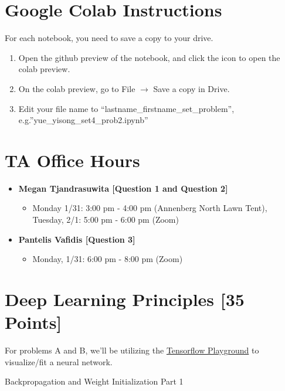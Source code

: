 \section*{Google Colab Instructions}
For each notebook, you need to save a copy to your drive.
\begin{enumerate}
	\item Open the github preview of the notebook, and click the icon to open the colab preview.
	\item On the colab preview, go to File $\rightarrow$ Save a copy in Drive.
	\item Edit your file name to “lastname_firstname_set_problem”, e.g.”yue_yisong_set4_prob2.ipynb”
\end{enumerate}

\section*{TA Office Hours}
\begin{itemize}
    \item \textbf{Megan Tjandrasuwita [Question 1 and Question 2]}
        \begin{itemize}
            \item Monday 1/31: 3:00 pm - 4:00 pm (Annenberg North Lawn Tent), Tuesday, 2/1: 5:00 pm - 6:00 pm (Zoom)
        \end{itemize}
    \item \textbf{Pantelis Vafidis [Question 3]}
        \begin{itemize}
            \item Monday, 1/31: 6:00 pm - 8:00 pm (Zoom)
        \end{itemize}
\end{itemize}


\newpage
\section{Deep Learning Principles [35 Points]}

 For problems A and B, we'll be utilizing the \href{http://playground.tensorflow.org/}{Tensorflow Playground} to visualize/fit a neural network.

\begin{problem}[5]
  Backpropagation and Weight Initialization Part 1
\end{problem}

